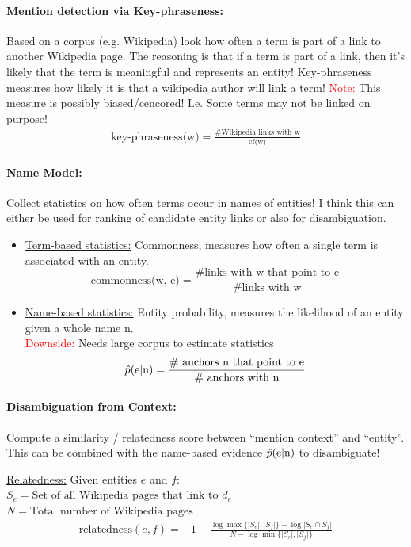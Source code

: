 \documentclass[a4paper,11pt]{article}
\begin{document}
\begin{multicols}{2}
\paragraph{Mention detection via Key-phraseness:} Based on a corpus (e.g. Wikipedia) look how often a term is part of a link to another Wikipedia page. The reasoning is that if a term is part of a link, then it's likely that the term is meaningful and represents an entity! Key-phraseness measures how likely it is that a wikipedia author will link a term! 
\textcolor{red}{Note:} This measure is possibly biased/cencored! I.e. Some terms may not be linked on purpose!
\begin{align*}
  \text{key-phraseness(w)} = \frac{\# \text{Wikipedia links with w}}{\text{cf(w)}}
\end{align*}

\paragraph{Name Model:} Collect statistics on how often terms occur in names of entities! I think this can either be used for ranking of candidate entity links or also for disambiguation.
\begin{addmargin}[0.28cm]{0cm} %
  \begin{itemize}
    \item \underline{Term-based statistics:} Commonness, measures how often a single term is associated with an entity.
    \[
      \text{commonness(w, e)} = \frac{\text{\# links with w that point to e}}{\text{\# links with w}}
    \]
    \item \underline{Name-based statistics:} Entity probability, measures the likelihood of an entity given a whole name n. \\
    \textcolor{red}{Downside:} Needs large corpus to estimate statistics
    \[
      \hat{p}(\text e | \text n) = \frac{\text{\# anchors n that point to e}}{\text{\# anchors with n}}
    \]
  \end{itemize}
\end{addmargin}

\paragraph{Disambiguation from Context:} Compute a similarity / relatedness score between ``mention context'' and ``entity''. This can be combined with the name-based evidence $\hat{p}(\text e | \text n)$ to disambiguate!
\begin{addmargin}[0.28cm]{0cm} %
  \underline{Relatedness:} Given entities $e$ and $f$:\\
  $S_e = \text{Set of all Wikipedia pages that link to } d_e$\\
  $N = \text{Total number of Wikipedia pages}$
  \begin{align*}
    \text{relatedness}(e, f) =& 1 - \frac{\log \max\{|S_e|, |S_f|\} - \log| S_e \cap S_f |}{N - \log \min \{ |S_e|, |S_f| \}}
  \end{align*}
\end{addmargin}


\end{multicols}
\end{document}

